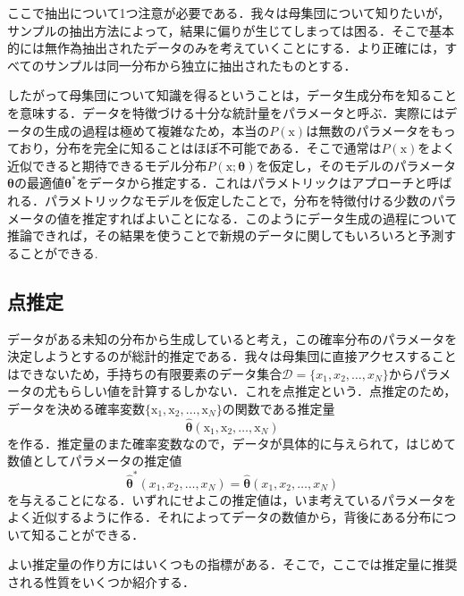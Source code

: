 \documentclass[a4paper,11pt]{jsreport}
\begin{document}
ここで抽出について1つ注意が必要である．我々は母集団について知りたいが，サンプルの抽出方法によって，結果に偏りが生じてしまっては困る．そこで基本的には無作為抽出されたデータのみを考えていくことにする．より正確には，すべてのサンプルは同一分布から独立に抽出されたものとする．\par
したがって母集団について知識を得るということは，データ生成分布を知ることを意味する．データを特徴づける十分な統計量をパラメータと呼ぶ．実際にはデータの生成の過程は極めて複雑なため，本当の$P(\mathrm{x})$は無数のパラメータをもっており，分布を完全に知ることはほぼ不可能である．そこで通常は$P(\mathrm{x})$をよく近似できると期待できるモデル分布$P(\mathrm{x};\bm{\theta})$を仮定し，そのモデルのパラメータ$\bm{\theta}$の最適値$\bm{\theta}^*$をデータから推定する．これはパラメトリックはアプローチと呼ばれる．パラメトリックなモデルを仮定したことで，分布を特徴付ける少数のパラメータの値を推定すればよいことになる．このようにデータ生成の過程について推論できれば，その結果を使うことで新規のデータに関してもいろいろと予測することができる.
\subsection{点推定}
データがある未知の分布から生成していると考え，この確率分布のパラメータを決定しようとするのが総計的推定である．我々は母集団に直接アクセスすることはできないため，手持ちの有限要素のデータ集合$\mathcal{D} = \{ x_1, x_2,\dots, x_N \}$からパラメータの尤もらしい値を計算するしかない．これを点推定という．点推定のため，データを決める確率変数$\{ \mathrm{x}_1, \mathrm{x}_2, \dots, \mathrm{x}_N \}$の関数である推定量
\begin{equation}
  \hat{\bm{\theta}}( \mathrm{x}_1, \mathrm{x}_2, \dots, \mathrm{x}_N )
\end{equation}
を作る．推定量のまた確率変数なので，データが具体的に与えられて，はじめて数値としてパラメータの推定値
\begin{equation}
  \hat{\bm{\theta}}^*( x_1, x_2, \dots, x_N )
  =\hat{\bm{\theta}}( x_1, x_2, \dots, x_N )
\end{equation}
を与えることになる．いずれにせよこの推定値は，いま考えているパラメータをよく近似するように作る．それによってデータの数値から，背後にある分布について知ることができる．\par
よい推定量の作り方にはいくつもの指標がある．そこで，ここでは推定量に推奨される性質をいくつか紹介する．
\end{document}
